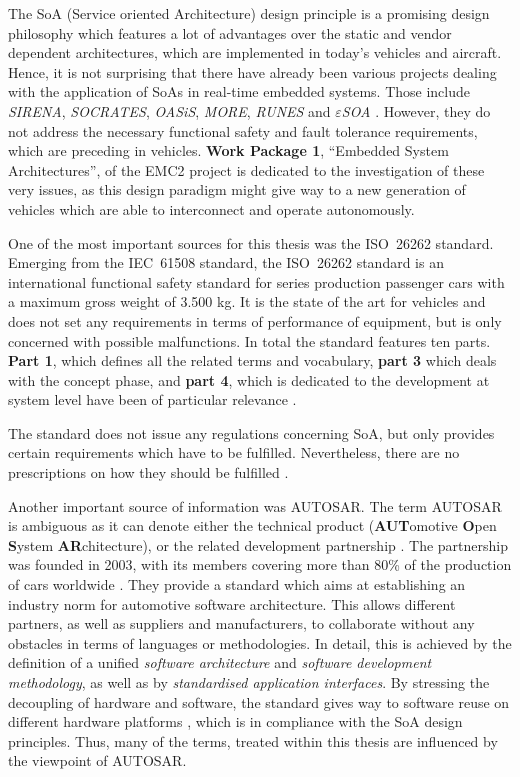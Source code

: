\label{ch:introduction}
The SoA (Service oriented Architecture) design principle is a promising design philosophy which features a lot of advantages over the static and vendor dependent architectures, which are implemented in today's vehicles and aircraft. Hence, it is not surprising that there have already been various projects dealing with the application of SoAs in real-time embedded systems. Those include \emph{SIRENA}, \emph{SOCRATES}, \emph{OASiS}, \emph{MORE}, \emph{RUNES} and \emph{$\varepsilon$SOA} \cite{scholz} \cite{sommer} \cite{buckl}. However, they do not address the necessary functional safety and fault tolerance requirements, which are preceding in vehicles. \textbf{Work Package 1}, ``Embedded System Architectures'', of the EMC2 project is dedicated to the investigation of these very issues, as this design paradigm might give way to a new generation of vehicles which are able to interconnect and operate autonomously.

One of the most important sources for this thesis was the \mbox{ISO 26262} standard. Emerging from the \mbox{IEC 61508} standard, the \mbox{ISO 26262} standard is an international functional safety standard for series production passenger cars with a maximum gross weight of 3.500 kg. It is the state of the art for vehicles and does not set any requirements in terms of performance of equipment, but is only concerned with possible malfunctions. In total the standard features ten parts. \textbf{Part 1}, which defines all the related terms and vocabulary, \textbf{part 3} which deals with the concept phase, and \textbf{part 4}, which is dedicated  to the development at system level have been of particular relevance \cite{iso26262:1} \cite{iso26262:3} \cite{iso26262:4}.

The standard does not issue any regulations concerning SoA, but only provides certain requirements which have to be fulfilled. Nevertheless, there are no prescriptions on how they should be fulfilled \cite{iso26262:course1}.

Another important source of information was \mbox{AUTOSAR}. The term \mbox{AUTOSAR} is ambiguous as it can denote either the technical product (\textbf{AUT}omotive \textbf{O}pen \textbf{S}ystem \textbf{AR}chitecture), or the related development partnership \cite{autosar_rs_main}. The partnership was founded in 2003, with its members covering more than 80\% of the production of cars worldwide \cite{kirschke_biller2011} \cite{schmerler2012}. They provide a standard which aims at establishing an industry norm for automotive software architecture. This allows different partners, as well as suppliers and manufacturers, to collaborate without any obstacles in terms of languages or methodologies. In detail, this is achieved by the definition of a unified \emph{software architecture} and \emph{software development methodology}, as well as by \emph{standardised application interfaces}. By stressing the decoupling of hardware and software, the standard gives way to software reuse on different hardware platforms \cite{kirschke_biller2011} \cite{schmerler2012}, which is in compliance with the SoA design principles. Thus, many of the terms, treated within this thesis are influenced by the viewpoint of \mbox{AUTOSAR}.
